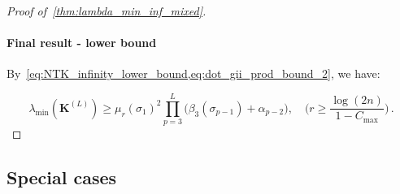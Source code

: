 \documentclass[nohyperref]{article}
\theoremstyle{plain}
\theoremstyle{definition}
\theoremstyle{remark}
\begin{document}
\begin{proof}[Proof of~\cref{thm:lambda_min_inf_mixed}]
\paragraph{Final result - lower bound\\}

By~\cref{eq:NTK_infinity_lower_bound,eq:dot_gii_prod_bound_2}, we have:

\begin{equation*}
\lambda _{\min}(\bm{K}^{(L)}) \geq  \mu_{r}(\sigma_1)^{2}\prod_{p=3}^{L}\bigg(\beta_3(\sigma_{p-1})+\alpha_{p-2}\bigg), \quad \bigg(r \geq \frac{\log (2n)}{1-C_{\text{max}}}\bigg)\,.
\end{equation*}

\end{proof}

\subsection{Special cases}
\label{ssec:result_other_activation_function_inf}
\end{document}
